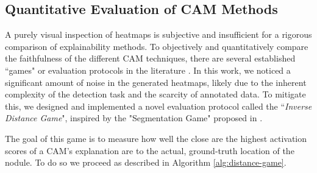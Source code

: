 \subsection{Quantitative Evaluation of CAM Methods}
\label{subsec:xai_evaluation}

A purely visual inspection of heatmaps is subjective and insufficient for a rigorous comparison of explainability methods. To objectively and quantitatively compare the faithfulness of the different CAM techniques, there are several established ``games" or evaluation protocols in the literature \cite{selvaraju2019gradcam,chattopadhay_2018gradcam++,wang2020score}. In this work, we noticed a significant amount of noise in the generated heatmaps, likely due to the inherent complexity of the detection task and the scarcity of annotated data.
To mitigate this, we designed and implemented a novel evaluation protocol called the ``\textit{Inverse Distance Game}", inspired by the "Segmentation Game" proposed in \cite{chattopadhay_2018gradcam++}.

The goal of this game is to measure how well the close are the highest activation scores of a CAM's explanation are to the actual, ground-truth location of the nodule. To do so we proceed as described in Algorithm \ref{alg:distance-game}.
\newline

